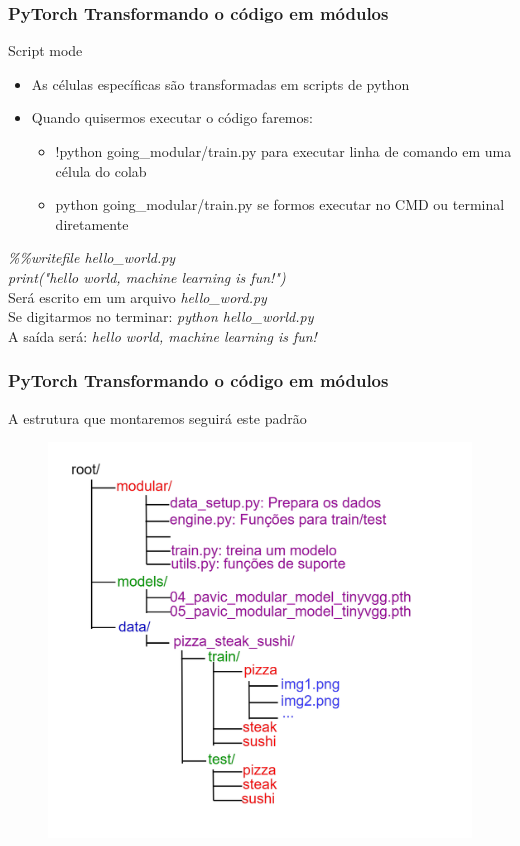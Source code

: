 \documentclass{beamer}
\begin{document}
\begin{frame}
	\frametitle{PyTorch Transformando o código em módulos}
	\begin{block}{Script mode}
		\begin{itemize} 
			\item As células específicas são transformadas em scripts de python
			\item Quando quisermos executar o código faremos:
			\begin{itemize}
				\item !python going\_modular/train.py para executar linha de comando em uma célula do colab
				\item python going\_modular/train.py se formos executar no CMD ou terminal diretamente
			\end{itemize}
		\end{itemize}
	\end{block}
	\begin{example}
		\textit{\%\%writefile hello\_world.py \\
		print("hello world, machine learning is fun!")} \\
		Será escrito em um arquivo  \textit{hello\_word.py} \\
		Se digitarmos no terminar: \textit{python hello\_world.py} \\
		A saída será: \textit{hello world, machine learning is fun!}
	\end{example}
\end{frame}
\begin{frame}
	\frametitle{PyTorch Transformando o código em módulos}
	\begin{block}{A estrutura que montaremos seguirá este padrão}
		\begin{figure}
			\centering
			\includegraphics[width=0.7\linewidth]{figures/modular}
		\end{figure}
	\end{block}
\end{frame}
\end{document}
